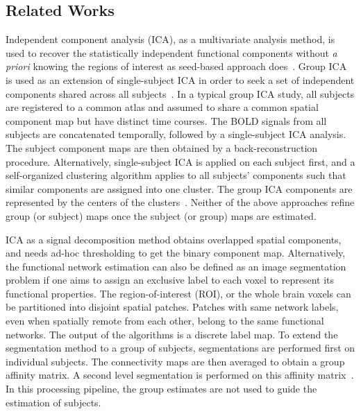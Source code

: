 \documentclass[review,authoryear]{elsarticle}
\begin{document}
\subsection{Related Works}
\label{sec:ref}
Independent component analysis (ICA), as a multivariate analysis method, is used
to recover the statistically independent functional components without \emph{a
  priori} knowing the regions of interest as seed-based approach
does~\citep{hyvarinen2000independent}. Group ICA is used as an extension of
single-subject ICA in order to seek a set of independent components shared
across all subjects~\citep{calhoun2001spatial, beckmann2009group}. In a typical
group ICA study, all subjects are registered to a common atlas and assumed to
share a common spatial component map but have distinct time courses. The BOLD
signals from all subjects are concatenated temporally, followed by a
single-subject ICA analysis. The subject component maps are then obtained by a
back-reconstruction procedure. Alternatively, single-subject ICA is applied on
each subject first, and a self-organized clustering algorithm applies to all
subjects' components such that similar components are assigned into one
cluster. The group ICA components are represented by the centers of the
clusters~\citep{esposito2005independent}. Neither of the above approaches refine
group (or subject) maps once the subject (or group) maps are estimated.

ICA as a signal decomposition method obtains overlapped spatial components, and
needs ad-hoc thresholding to get the binary component map. Alternatively, the
functional network estimation can also be defined as an image segmentation
problem if one aims to assign an exclusive label to each voxel to represent its
functional properties. The region-of-interest (ROI), or the whole brain voxels
can be partitioned into disjoint spatial patches. Patches with same network
labels, even when spatially remote from each other, belong to the same
functional networks. The output of the algorithms is a discrete label map. To
extend the segmentation method to a group of subjects, segmentations are
performed first on individual subjects. The connectivity maps are then averaged
to obtain a group affinity matrix. A second level segmentation is performed on
this affinity matrix~\citep{bellec2010multi, van2008normalized}. In this
processing pipeline, the group estimates are not used to guide the estimation of
subjects.
\end{document}
